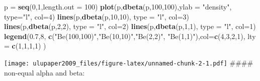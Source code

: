 \documentclass[
]{book}
\newenvironment{Shaded}{\begin{snugshade}}{\end{snugshade}}
\newcommand{\DataTypeTok}[1]{\textcolor[rgb]{0.13,0.29,0.53}{#1}}
\newcommand{\DecValTok}[1]{\textcolor[rgb]{0.00,0.00,0.81}{#1}}
\newcommand{\FloatTok}[1]{\textcolor[rgb]{0.00,0.00,0.81}{#1}}
\newcommand{\KeywordTok}[1]{\textcolor[rgb]{0.13,0.29,0.53}{\textbf{#1}}}
\newcommand{\NormalTok}[1]{#1}
\newcommand{\StringTok}[1]{\textcolor[rgb]{0.31,0.60,0.02}{#1}}
\begin{document}
\begin{Shaded}
\begin{Highlighting}[]
\NormalTok{p =}\StringTok{ }\KeywordTok{seq}\NormalTok{(}\DecValTok{0}\NormalTok{,}\DecValTok{1}\NormalTok{,}\DataTypeTok{length.out =} \DecValTok{100}\NormalTok{)}
\KeywordTok{plot}\NormalTok{(p,}\KeywordTok{dbeta}\NormalTok{(p,}\DecValTok{100}\NormalTok{,}\DecValTok{100}\NormalTok{),}\DataTypeTok{ylab =} \StringTok{"density"}\NormalTok{, }\DataTypeTok{type=}\StringTok{"l"}\NormalTok{, }\DataTypeTok{col=}\DecValTok{4}\NormalTok{)}
\KeywordTok{lines}\NormalTok{(p,}\KeywordTok{dbeta}\NormalTok{(p,}\DecValTok{10}\NormalTok{,}\DecValTok{10}\NormalTok{), }\DataTypeTok{type =} \StringTok{"l"}\NormalTok{, }\DataTypeTok{col=}\DecValTok{3}\NormalTok{)}
\KeywordTok{lines}\NormalTok{(p,}\KeywordTok{dbeta}\NormalTok{(p,}\DecValTok{2}\NormalTok{,}\DecValTok{2}\NormalTok{), }\DataTypeTok{type =} \StringTok{"l"}\NormalTok{, }\DataTypeTok{col=}\DecValTok{2}\NormalTok{)}
\KeywordTok{lines}\NormalTok{(p,}\KeywordTok{dbeta}\NormalTok{(p,}\DecValTok{1}\NormalTok{,}\DecValTok{1}\NormalTok{), }\DataTypeTok{type =} \StringTok{"l"}\NormalTok{, }\DataTypeTok{col=}\DecValTok{1}\NormalTok{)}
\KeywordTok{legend}\NormalTok{(}\FloatTok{0.7}\NormalTok{,}\DecValTok{8}\NormalTok{, }\KeywordTok{c}\NormalTok{(}\StringTok{"Be(100,100)"}\NormalTok{,}\StringTok{"Be(10,10)"}\NormalTok{,}\StringTok{"Be(2,2)"}\NormalTok{, }\StringTok{"Be(1,1)"}\NormalTok{),}\DataTypeTok{col=}\KeywordTok{c}\NormalTok{(}\DecValTok{4}\NormalTok{,}\DecValTok{3}\NormalTok{,}\DecValTok{2}\NormalTok{,}\DecValTok{1}\NormalTok{), }\DataTypeTok{lty =} \KeywordTok{c}\NormalTok{(}\DecValTok{1}\NormalTok{,}\DecValTok{1}\NormalTok{,}\DecValTok{1}\NormalTok{,}\DecValTok{1}\NormalTok{) )}
\end{Highlighting}
\end{Shaded}

\texttt{[image: ulupaper2009\_files/figure-latex/unnamed-chunk-2-1.pdf]}
\#\#\#\# non-equal alpha and beta:
\end{document}
